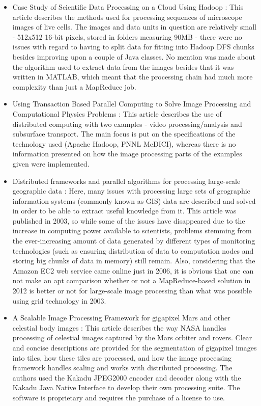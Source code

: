 \documentclass [12pt,a4paper]{report}
\begin{document}
\begin{itemize}
	\item Case Study of Scientific Data Processing on a Cloud Using Hadoop \cite{Zhang:2009:CSS:2127968.2128002}: This article describes the methods used for processing sequences of microscope images of live cells. The images and data units in question are relatively small - 512x512 16-bit pixels, stored in folders measuring 90MB - there were no issues with regard to having to split data for fitting into Hadoop DFS chunks besides improving upon a couple of Java classes. No mention was made about the algorithm used to extract data from the images besides that it was written in MATLAB, which meant that the processing chain had much more complexity than just a MapReduce job.
	\item Using Transaction Based Parallel Computing to Solve Image Processing and Computational Physics Problems \cite{trease08}: This article describes the use of distributed computing with two examples - video processing/analysis and subsurface transport. The main focus is put on the specifications of the technology used (Apache Hadoop, PNNL MeDICI), whereas there is no information presented on how the image processing parts of the examples given were implemented.
	\item Distributed frameworks and parallel algorithms for processing large-scale geographic data \cite{Hawick:2003:DFP:958021.958024}: Here, many issues with processing large sets of geographic information systems (commonly known as GIS) data are described and solved in order to be able to extract useful knowledge from it. This article was published in 2003, so while some of the issues have disappeared due to the increase in computing power available to scientists, problems stemming from the ever-increasing amount of data generated by different types of monitoring technologies (such as ensuring distribution of data to computation nodes and storing big chunks of data in memory) still remain. Also, considering that the Amazon EC2 \cite{website:amazon_ec2} web service came online just in 2006, it is obvious that one can not make an apt comparison whether or not a MapReduce-based solution in 2012 is better or not for large-scale image processing than what was possible using grid technology in 2003.
	\item A Scalable Image Processing Framework for gigapixel Mars and other celestial body  images \cite{5446706}: This article describes the way NASA handles processing of celestial images captured by the Mars orbiter and rovers. Clear and concise descriptions are provided for the segmentation of gigapixel images into tiles, how these tiles are processed, and how the image processing framework handles scaling and works with distributed processing. The authors used the Kakadu JPEG2000 encoder and decoder along with the Kakadu Java Native Interface to develop their own processing suite. The software is proprietary and requires the purchase of a license to use.

\end{itemize}
\end{document}
